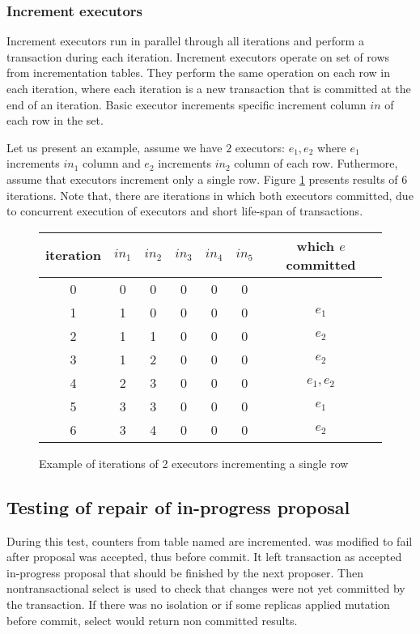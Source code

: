 \subsubsection{Increment executors}
Increment executors run in parallel through all iterations and perform a transaction during each iteration.
Increment executors operate on set of rows from incrementation tables. They perform the same operation on each row in each iteration, where each iteration is a new transaction that is committed at the end of an iteration. 
Basic executor increments specific increment column $in$ of each row in the set.

Let us present an example, assume we have $2$ executors: $e_1, e_2$ where $e_1$ increments $in_1$ column and $e_2$ increments $in_2$ column of each row. Futhermore, assume that executors increment only a single row. Figure \ref{fig:executorsExample} presents results of $6$ iterations. Note that, there are iterations in which both executors committed, due to concurrent execution of executors and short life-span of transactions.


\begin{figure}[h]
\centering
\begin{tabular}{c||c|c|c|c|c|c}
        \toprule
        iteration & $in_{1}$ & $in_{2}$ & $in_{3}$ & $in_{4}$ & $in_{5}$ & which $e$ committed \\ \midrule
        0 &         0        & 0        & 0        &  0       & 0        &    \\
        1 &         1        & 0        & 0        &  0       & 0        &   $e_1$ \\ 
        2 &         1        & 1        & 0        &  0       & 0        &   $e_2$ \\ 
        3 &         1        & 2        & 0        &  0       & 0        &   $e_2$ \\ 
        4 &         2        & 3        & 0        &  0       & 0        &   $e_1, e_2$ \\ 
        5 &         3        & 3        & 0        &  0       & 0        &   $e_1$ \\ 
        6 &         3        & 4        & 0        &  0       & 0        &   $e_2$ \\  \bottomrule
      \end{tabular}
      \caption{Example of iterations of 2 executors incrementing a single row}
  \label{fig:executorsExample}
\end{figure}

\subsection{Testing of repair of in-progress proposal}
 During this test, counters from table named  are incremented. 
 \mpt was modified to fail after proposal was accepted, thus before commit. It left transaction as accepted in-progress proposal that should be finished by the next proposer. 
 Then nontransactional select is used to check that changes were not yet committed by the transaction. If there was no isolation or if some replicas applied mutation before commit, select would return non committed results. 

